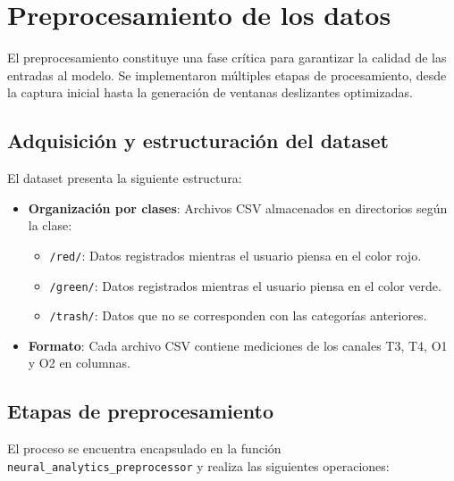 \section{Preprocesamiento de los datos}

El preprocesamiento constituye una fase crítica para garantizar la calidad de las entradas al modelo. Se implementaron múltiples etapas de procesamiento, desde la captura inicial hasta la generación de ventanas deslizantes optimizadas.

\subsection{Adquisición y estructuración del dataset}

El dataset presenta la siguiente estructura:

\begin{itemize}
    \item \textbf{Organización por clases}: Archivos CSV almacenados en directorios según la clase:
    \begin{itemize}
        \item \texttt{/red/}: Datos registrados mientras el usuario piensa en el color rojo.
        \item \texttt{/green/}: Datos registrados mientras el usuario piensa en el color verde.
        \item \texttt{/trash/}: Datos que no se corresponden con las categorías anteriores.
    \end{itemize}
    
    \item \textbf{Formato}: Cada archivo CSV contiene mediciones de los canales T3, T4, O1 y O2 en columnas.
\end{itemize}

\subsection{Etapas de preprocesamiento}

El proceso se encuentra encapsulado en la función \texttt{neural\_analytics\_preprocessor} y realiza las siguientes operaciones:

